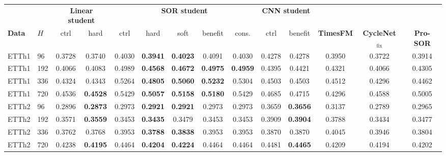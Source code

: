 \begin{tabular}{llcccccccccccc}
\toprule
& & \multicolumn{2}{c}{\textbf{Linear student}} & \multicolumn{5}{c}{\textbf{SOR student}} & \multicolumn{2}{c}{\textbf{CNN student}} & & & \\
\cmidrule(lr){3-4} \cmidrule(lr){5-9} \cmidrule(lr){10-11}
\textbf{Data} & $H$ & ctrl & hard & ctrl & hard & soft & benefit & cons. & ctrl & benefit & \textbf{TimesFM} & \textbf{CycleNet$_{\text{fix}}$} & \textbf{Pro-SOR} \\
\midrule
ETTh1 & 96 & 0.3728 & 0.3740 & 0.4030 & \textbf{0.3941} & \textbf{0.4023} & 0.4091 & 0.4030 & 0.4278 & 0.4278 & 0.3950 & 0.3722 & 0.3914 \\
ETTh1 & 192 & 0.4066 & 0.4083 & 0.4989 & \textbf{0.4568} & \textbf{0.4672} & \textbf{0.4975} & \textbf{0.4959} & 0.4395 & 0.4421 & 0.4321 & 0.4066 & 0.4305 \\
ETTh1 & 336 & 0.4324 & 0.4343 & 0.5264 & \textbf{0.4805} & \textbf{0.5060} & \textbf{0.5232} & 0.5304 & 0.4503 & 0.4503 & 0.4512 & 0.4296 & 0.4462 \\
ETTh1 & 720 & 0.4536 & \textbf{0.4528} & 0.5429 & \textbf{0.5057} & \textbf{0.5158} & \textbf{0.5180} & 0.5429 & 0.4685 & 0.4715 & 0.4296 & 0.4588 & 0.5005 \\
\midrule
ETTh2 & 96 & 0.2896 & \textbf{0.2873} & 0.2973 & \textbf{0.2921} & \textbf{0.2921} & 0.2973 & 0.2973 & 0.3659 & \textbf{0.3656} & 0.3137 & 0.2789 & 0.2965 \\
ETTh2 & 192 & 0.3571 & \textbf{0.3559} & 0.3453 & \textbf{0.3435} & 0.3479 & 0.3453 & 0.3453 & 0.3909 & \textbf{0.3904} & 0.3788 & 0.3434 & 0.3477 \\
ETTh2 & 336 & 0.3762 & 0.3768 & 0.3953 & \textbf{0.3788} & \textbf{0.3838} & 0.3953 & 0.3953 & 0.3870 & 0.3870 & 0.4045 & 0.3946 & 0.3804 \\
ETTh2 & 720 & 0.4238 & \textbf{0.4195} & 0.4464 & \textbf{0.4204} & \textbf{0.4224} & 0.4464 & 0.4464 & 0.4481 & \textbf{0.4465} & 0.4209 & 0.4194 & 0.4202 \\
\bottomrule
\end{tabular}
